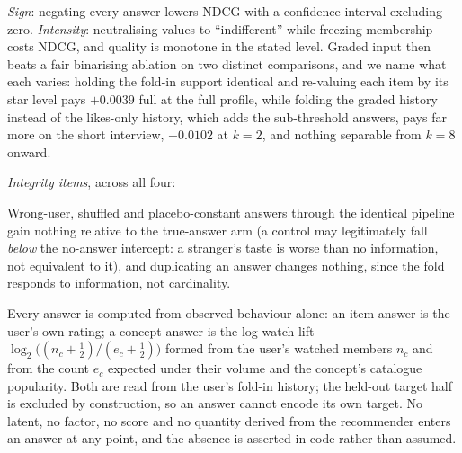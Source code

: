 \documentclass[manuscript,screen]{acmart}
\begin{document}
\begin{description}[leftmargin=2.4em,itemsep=1.5pt]
  \item[R4, expressive answers.] \emph{Sign}: negating every answer lowers NDCG with a confidence interval excluding zero. \emph{Intensity}: neutralising values to ``indifferent'' while freezing membership costs NDCG, and quality is monotone in the stated level. Graded input then beats a fair binarising ablation on two distinct comparisons, and we name what each varies: holding the fold-in support identical and re-valuing each item by its star level pays $+0.0039$ full at the full profile, while folding the graded history instead of the likes-only history, which adds the sub-threshold answers, pays far more on the short interview, $+0.0102$ at $k{=}2$, and nothing separable from $k{=}8$ onward.
\end{description}

\noindent\emph{Integrity items}, across all four:
\begin{description}[leftmargin=2.4em,itemsep=1.5pt]
  \item[Existential controls.] Wrong-user, shuffled and placebo-constant answers through the identical pipeline gain nothing relative to the true-answer arm (a control may legitimately fall \emph{below} the no-answer intercept: a stranger's taste is worse than no information, not equivalent to it), and duplicating an answer changes nothing, since the fold responds to information, not cardinality.
  \item[No recommender geometry in answers.] Every answer is computed from observed behaviour alone: an item answer is the user's own rating; a concept answer is the log watch-lift $\log_2\!\big((n_c+\tfrac12)/(e_c+\tfrac12)\big)$ formed from the user's watched members $n_c$ and from the count $e_c$ expected under their volume and the concept's catalogue popularity. Both are read from the user's fold-in history; the held-out target half is excluded by construction, so an answer cannot encode its own target. No latent, no factor, no score and no quantity derived from the recommender enters an answer at any point, and the absence is asserted in code rather than assumed.
\end{description}
\end{document}
